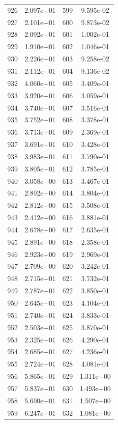 \documentclass[12pt]{article}
\begin{document}
\begin{longtable}{@{}cccc@{}}
926 & 2.097e+01 & 599 & 9.595e-02 \\
927 & 2.101e+01 & 600 & 9.873e-02 \\
928 & 2.092e+01 & 601 & 1.002e-01 \\
929 & 1.910e+01 & 602 & 1.046e-01 \\
930 & 2.226e+01 & 603 & 9.258e-02 \\
931 & 2.112e+01 & 604 & 9.136e-02 \\
932 & 4.060e+01 & 605 & 3.409e-01 \\
933 & 3.920e+01 & 606 & 3.059e-01 \\
934 & 3.740e+01 & 607 & 3.516e-01 \\
935 & 3.752e+01 & 608 & 3.378e-01 \\
936 & 3.713e+01 & 609 & 2.369e-01 \\
937 & 3.691e+01 & 610 & 3.428e-01 \\
938 & 3.983e+01 & 611 & 3.790e-01 \\
939 & 3.805e+01 & 612 & 3.785e-01 \\
940 & 3.058e+00 & 613 & 3.467e-01 \\
941 & 2.892e+00 & 614 & 3.804e-01 \\
942 & 2.812e+00 & 615 & 3.508e-01 \\
943 & 2.412e+00 & 616 & 3.881e-01 \\
944 & 2.678e+00 & 617 & 2.635e-01 \\
945 & 2.891e+00 & 618 & 2.358e-01 \\
946 & 2.923e+00 & 619 & 2.969e-01 \\
947 & 2.709e+00 & 620 & 3.242e-01 \\
948 & 2.715e+01 & 621 & 3.732e-01 \\
949 & 2.787e+01 & 622 & 3.850e-01 \\
950 & 2.645e+01 & 623 & 4.104e-01 \\
951 & 2.740e+01 & 624 & 3.833e-01 \\
952 & 2.503e+01 & 625 & 3.870e-01 \\
953 & 2.325e+01 & 626 & 4.290e-01 \\
954 & 2.685e+01 & 627 & 4.236e-01 \\
955 & 2.724e+01 & 628 & 4.081e-01 \\
956 & 5.865e+01 & 629 & 1.311e+00 \\
957 & 5.837e+01 & 630 & 1.493e+00 \\
958 & 5.690e+01 & 631 & 1.507e+00 \\
959 & 6.247e+01 & 632 & 1.081e+00 \\

\end{longtable}
\end{document}
